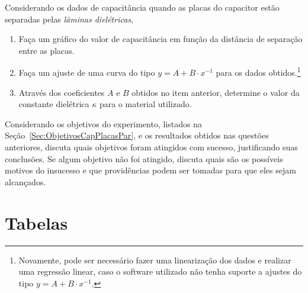 \begin{question}[type={exam}]{3}
Considerando os dados de capacitância quando as placas do capacitor estão separadas pelas \emph{lâminas dielétricas},
\begin{enumerate}[label=\roman*.]
    \item Faça um gráfico do valor de capacitância em função da distância de separação entre as placas.
    \item Faça um ajuste de uma curva do tipo $y = A + B \cdot x^{-1}$ para os dados obtidos.\footnote{Novamente, pode ser necessário fazer uma linearização dos dados e realizar uma regressão linear, caso o software utilizado não tenha suporte a ajustes do tipo $y = A + B \cdot x^{-1}$.} 
    \item Através dos coeficientes $A$ e $B$ obtidos no item anterior, determine o valor da constante dielétrica $\kappa$ para o material utilizado. 
\end{enumerate}
\end{question}

\begin{question}[type={exam}]{2}
Considerando os objetivos do experimento, listados na Seção~\ref{Sec:ObjetivosCapPlacasPar}, e os resultados obtidos nas questões anteriores, discuta quais objetivos foram atingidos com sucesso, justificando suas conclusões. Se algum objetivo não foi atingido, discuta quais são os possíveis motivos do insucesso e que providências podem ser tomadas para que eles sejam alcançados.
\end{question}

\vfill
\pagebreak
\section{Tabelas}

